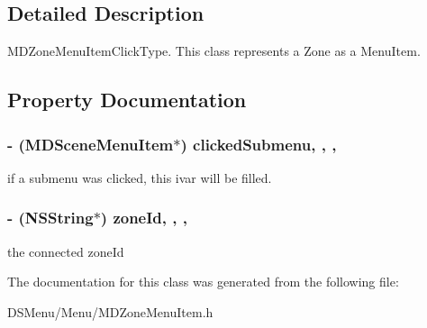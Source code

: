 \subsection{Detailed Description}
M\-D\-Zone\-Menu\-Item\-Click\-Type. This class represents a Zone as a Menu\-Item. 

\subsection{Property Documentation}
\hypertarget{interface_m_d_zone_menu_item_a6a4957a6b3fe720a65aa67f6c07be18f}{
\subsubsection[{clicked\-Submenu}]{\setlength{\rightskip}{0pt plus 5cm}-\/ ({\bf M\-D\-Scene\-Menu\-Item}$\ast$) clicked\-Submenu\hspace{0.3cm}{\ttfamily [read]}, {\ttfamily [write]}, {\ttfamily [atomic]}, {\ttfamily [strong]}}}\label{interface_m_d_zone_menu_item_a6a4957a6b3fe720a65aa67f6c07be18f}
if a submenu was clicked, this ivar will be filled. \hypertarget{interface_m_d_zone_menu_item_a0233a890891b84a2c30226439a3185ea}{
\subsubsection[{zone\-Id}]{\setlength{\rightskip}{0pt plus 5cm}-\/ (N\-S\-String$\ast$) zone\-Id\hspace{0.3cm}{\ttfamily [read]}, {\ttfamily [write]}, {\ttfamily [atomic]}, {\ttfamily [strong]}}}\label{interface_m_d_zone_menu_item_a0233a890891b84a2c30226439a3185ea}
the connected zone\-Id 

The documentation for this class was generated from the following file\-:\begin{DoxyCompactItemize}
\item 
D\-S\-Menu/\-Menu/M\-D\-Zone\-Menu\-Item.\-h\end{DoxyCompactItemize}
